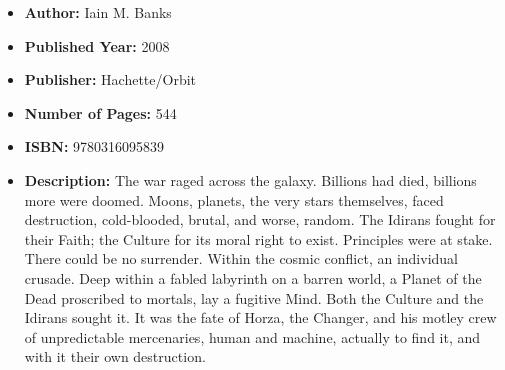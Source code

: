 \documentclass{tufte-handout}
\begin{document}
\begin{itemize}
    \item[] \textbf{Author:} Iain M. Banks
    \item[] \textbf{Published Year:} 2008
    \item[] \textbf{Publisher:} Hachette/Orbit
    \item[] \textbf{Number of Pages:} 544      
    \item[] \textbf{ISBN:} 9780316095839
    \item[] \textbf{Description:} The war raged across the galaxy. Billions had died, billions more were doomed. Moons, planets, the very stars themselves, faced destruction, cold-blooded, brutal, and worse, random. The Idirans fought for their Faith; the Culture for its moral right to exist. Principles were at stake. There could be no surrender. Within the cosmic conflict, an individual crusade. Deep within a fabled labyrinth on a barren world, a Planet of the Dead proscribed to mortals, lay a fugitive Mind. Both the Culture and the Idirans sought it. It was the fate of Horza, the Changer, and his motley crew of unpredictable mercenaries, human and machine, actually to find it, and with it their own destruction.
\end{itemize}
\end{document}
